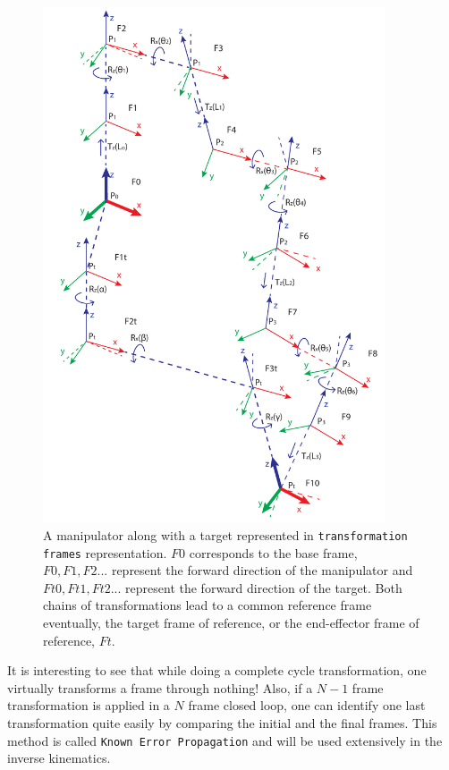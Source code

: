 {{        \begin{figure}
          \centering
          \includegraphics[width=0.9\textwidth]{CompleteRep.pdf}
          \caption{A manipulator along with a target represented in \texttt{transformation frames} representation. $F0$ corresponds to the base frame, $F0, F1, F2 ...$ represent the forward direction of the manipulator and $Ft0, Ft1, Ft2 ...$ represent the forward direction of the target. Both chains of transformations lead to a common reference frame eventually, the target frame of reference, or the end-effector frame of reference, $Ft$.
          } \label{FigCompleteRep}
        \end{figure}

        It is interesting to see that while doing a complete cycle transformation, one virtually transforms a frame through nothing! Also, if a $N-1$ frame transformation is applied in a $N$ frame closed loop, one can identify one last transformation quite easily by comparing the initial and the final frames. This method is called \texttt{Known Error Propagation} and will be used extensively in the inverse kinematics.

}}
